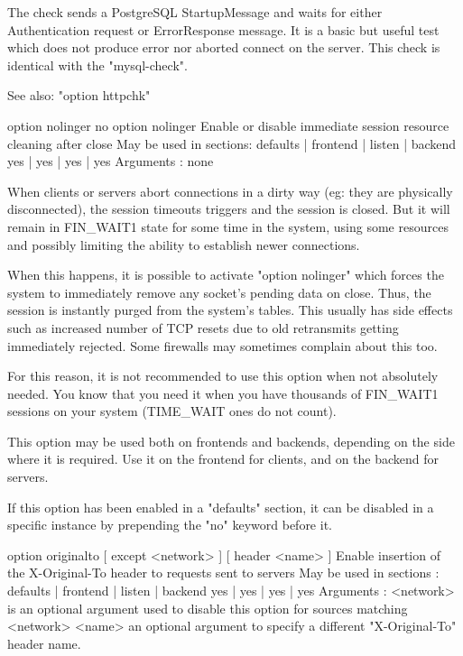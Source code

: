  The check sends a PostgreSQL StartupMessage and waits for either
  Authentication request or ErrorResponse message. It is a basic but useful
  test which does not produce error nor aborted connect on the server.
  This check is identical with the "mysql-check".

  See also: "option httpchk"

option nolinger
no option nolinger
  Enable or disable immediate session resource cleaning after close
  May be used in sections:    defaults | frontend | listen | backend
                                 yes   |    yes   |   yes  |   yes
  Arguments : none

  When clients or servers abort connections in a dirty way (eg: they are
  physically disconnected), the session timeouts triggers and the session is
  closed. But it will remain in FIN_WAIT1 state for some time in the system,
  using some resources and possibly limiting the ability to establish newer
  connections.

  When this happens, it is possible to activate "option nolinger" which forces
  the system to immediately remove any socket's pending data on close. Thus,
  the session is instantly purged from the system's tables. This usually has
  side effects such as increased number of TCP resets due to old retransmits
  getting immediately rejected. Some firewalls may sometimes complain about
  this too.

  For this reason, it is not recommended to use this option when not absolutely
  needed. You know that you need it when you have thousands of FIN_WAIT1
  sessions on your system (TIME_WAIT ones do not count).

  This option may be used both on frontends and backends, depending on the side
  where it is required. Use it on the frontend for clients, and on the backend
  for servers.

  If this option has been enabled in a "defaults" section, it can be disabled
  in a specific instance by prepending the "no" keyword before it.


option originalto [ except <network> ] [ header <name> ]
  Enable insertion of the X-Original-To header to requests sent to servers
  May be used in sections :   defaults | frontend | listen | backend
                                 yes   |    yes   |   yes  |   yes
  Arguments :
    <network> is an optional argument used to disable this option for sources
              matching <network>
    <name>    an optional argument to specify a different "X-Original-To"
              header name.

